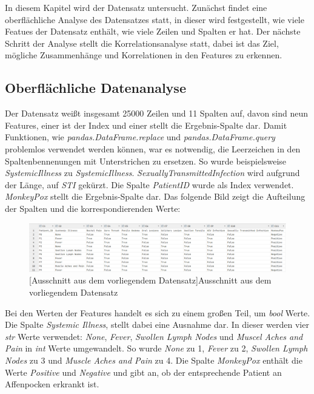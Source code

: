 \documentclass[13pt,a4paper, listof=entryprefix, bibliography=totocnumbered,toc=listofnumbered,lof=listofnumbered]{scrartcl}
\begin{document}
In diesem Kapitel wird der Datensatz untersucht. Zunächst findet eine oberflächliche Analyse des Datensatzes statt, in dieser
wird festgestellt, wie viele Featues der Datensatz enthält, wie viele Zeilen und Spalten er hat. Der nächste Schritt der Analyse stellt die Korrelationsanalyse
statt, dabei ist das Ziel, mögliche Zusammenhänge und Korrelationen in den Features zu erkennen. 

	\subsection{Oberflächliche Datenanalyse}
		\label{ch:oberflaechliche_analyse}

Der Datensatz weißt insgesamt 25000 Zeilen und 11 Spalten auf, davon sind 
neun Features, einer ist der Index und einer stellt die Ergebnis-Spalte dar. Damit Funktionen, wie \textit{pandas.DataFrame.replace} und 
\textit{pandas.DataFrame.query} problemlos verwendet werden können, war es notwendig, die Leerzeichen in den Spaltenbennenungen mit Unterstrichen zu ersetzen. 
So wurde beispielsweise \textit{Systemic\textunderscore Illness} zu \textit{Systemic\textunderscore Illness}. \textit{Sexually\textunderscore Transmitted\textunderscore Infection} wird aufgrund der Länge, auf
\textit{STI} gekürzt. Die Spalte \textit{Patient\textunderscore ID} wurde als Index verwendet. 
\textit{MonkeyPox} stellt die Ergebnis-Spalte dar. Das folgende Bild zeigt die Aufteilung der Spalten und die korrespondierenden Werte:

	\begin{figure}[H]
		\centering
		\includegraphics[width=0.8\linewidth]{Bilder/data_table.png}
		[Ausschnitt aus dem vorliegendem Datensatz]{Ausschnitt aus dem vorliegendem Datensatz}
		\label{fig:data_table}
	\end{figure}

Bei den Werten der Features handelt es sich zu einem großen Teil, um \textit{bool} Werte. Die Spalte \textit{Systemic Illness}, stellt dabei eine Ausnahme dar. In dieser werden
vier \textit{str} Werte verwendet: \textit{None}, \textit{Fever}, \textit{Swollen Lymph Nodes} und \textit{Muscel Aches and Pain} in \textit{int} Werte umgewandelt. So wurde \textit{None} zu 1,
\textit{Fever} zu 2, \textit{Swollen Lymph Nodes} zu 3 und \textit{Muscle Aches and Pain} zu 4. Die Spalte \textit{MonkeyPox} enthält die Werte \textit{Positive} und \textit{Negative} und gibt
an, ob der entsprechende Patient an Affenpocken erkrankt ist.
\end{document}
